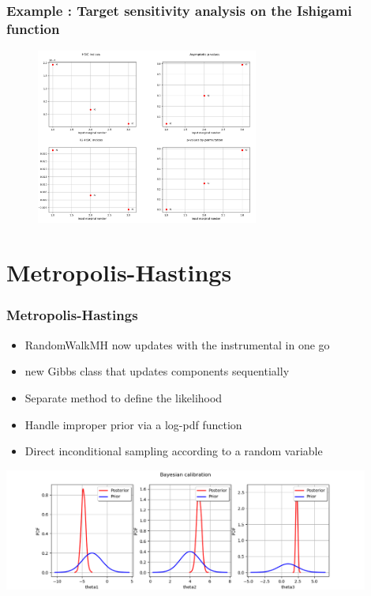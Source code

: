 \documentclass[aspectratio=169]{beamer}
\begin{document}
\begin{frame}
\frametitle{Example : Target sensitivity analysis on the Ishigami function}
\begin{figure}
   \includegraphics[width=0.65\textwidth]{figures/HSIC2.png}
\end{figure}
\end{frame}

\section{Metropolis-Hastings}
% 
\begin{frame}[containsverbatim]
\frametitle{Metropolis-Hastings}

\begin{itemize}
\item RandomWalkMH now updates with the instrumental in one go
\item new Gibbs class that updates components sequentially
\item Separate method to define the likelihood
\item Handle improper prior via a log-pdf function
\item Direct inconditional sampling according to a random variable
\end{itemize}

 
\begin{center}
\includegraphics[width=0.9\textwidth]{figures/sphx_glr_plot_bayesian_calibration_002.png}
\end{center}
\end{frame}
\end{document}
